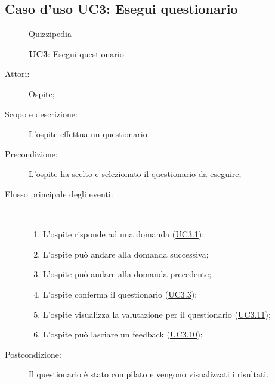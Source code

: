 \subsection{Caso d'uso UC3: Esegui questionario}
\begin{figure}[H]
	\centering
	\begin{resizedtikzpicture}{\textwidth}
		\begin{umlsystem}[x=0, fill=lightgray!20]{Quizzipedia}
		\end{umlsystem}
	\end{resizedtikzpicture}
	\caption{\textbf{UC3}: Esegui questionario}
	\label{UC3}
\end{figure}
\begin{description}
	\item[Attori:] Ospite;
	\item[Scopo e descrizione:] L'ospite effettua un questionario
	\item[Precondizione:] L'ospite ha scelto e selezionato il questionario da eseguire;
	
	\item[Flusso principale degli eventi:] \ 
	\begin{enumerate}
		\item L'ospite risponde ad una domanda (\hyperlink{UC3.1}{UC3.1});
		\item L'ospite può andare alla domanda successiva;
		\item L'ospite può andare alla domanda precedente;
		\item L'ospite conferma il questionario (\hyperlink{UC3.3}{UC3.3});
		\item L'ospite visualizza la valutazione per il questionario (\hyperlink{UC3.11}{UC3.11});
		\item L'ospite può lasciare un feedback (\hyperlink{UC3.10}{UC3.10});
		
	\end{enumerate}
	\item[Postcondizione:] Il questionario è stato compilato e vengono visualizzati i risultati.
\end{description}
\hypertarget{UC3.1}{}
